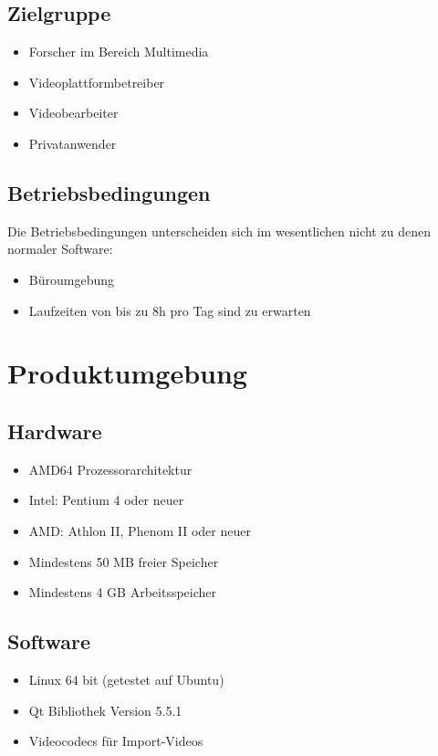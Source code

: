 \documentclass[parskip=full]{scrartcl}
\begin{document}
\subsection{Zielgruppe}
\begin{itemize}
\item Forscher im Bereich Multimedia
\item Videoplattformbetreiber
\item Videobearbeiter
\item Privatanwender
\end{itemize}
\subsection{Betriebsbedingungen}
Die Betriebsbedingungen unterscheiden sich im wesentlichen nicht zu denen normaler Software:
\begin{itemize}
\item Büroumgebung
\item Laufzeiten von bis zu 8h pro Tag sind zu erwarten
\end{itemize}
\newpage
\section{Produktumgebung}

\subsection{Hardware}
\begin{itemize}
\item AMD64 Prozessorarchitektur
\item Intel: Pentium 4 oder neuer
\item AMD: Athlon II, Phenom II oder neuer
\item Mindestens 50 MB freier Speicher
\item Mindestens 4 GB Arbeitsspeicher
\end{itemize}
\subsection{Software}
\begin{itemize}
\item Linux 64 bit (getestet auf Ubuntu)
\item Qt Bibliothek Version 5.5.1
\item Videocodecs für Import-Videos
\end{itemize}
\newpage
\end{document}
